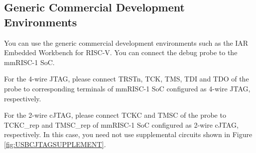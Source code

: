 \subsection{Generic Commercial Development Environments}

You can use the generic commercial development environments such as the IAR Embedded Workbench for RISC-V. You can connect the debug probe to the mmRISC-1 SoC. 

For the 4-wire JTAG, please connect TRSTn, TCK, TMS, TDI and TDO of the probe to corresponding terminals of mmRISC-1 SoC configured as 4-wire JTAG, respectively. 

For the 2-wire cJTAG, please connect TCKC and TMSC of the probe to TCKC\_rep and TMSC\_rep of mmRISC-1 SoC configured as 2-wire cJTAG, respectively. In this case, you need not use supplemental circuits shown in Figure \ref{fig:USBCJTAGSUPPLEMENT}.




